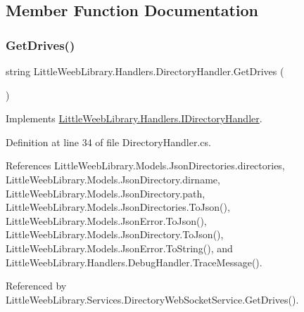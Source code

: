 \subsection{Member Function Documentation}
\mbox{\label{class_little_weeb_library_1_1_handlers_1_1_directory_handler_a6ab9fa9b838eeca3f918429af0a3564d}} 
\subsubsection{\texorpdfstring{Get\+Drives()}{GetDrives()}}
{\footnotesize\ttfamily string Little\+Weeb\+Library.\+Handlers.\+Directory\+Handler.\+Get\+Drives (\begin{DoxyParamCaption}{ }\end{DoxyParamCaption})}



Implements \mbox{\hyperlink{interface_little_weeb_library_1_1_handlers_1_1_i_directory_handler_ac0cc258a8bef2c9956638e14ad7d1e63}{Little\+Weeb\+Library.\+Handlers.\+I\+Directory\+Handler}}.



Definition at line 34 of file Directory\+Handler.\+cs.



References Little\+Weeb\+Library.\+Models.\+Json\+Directories.\+directories, Little\+Weeb\+Library.\+Models.\+Json\+Directory.\+dirname, Little\+Weeb\+Library.\+Models.\+Json\+Directory.\+path, Little\+Weeb\+Library.\+Models.\+Json\+Directories.\+To\+Json(), Little\+Weeb\+Library.\+Models.\+Json\+Error.\+To\+Json(), Little\+Weeb\+Library.\+Models.\+Json\+Directory.\+To\+Json(), Little\+Weeb\+Library.\+Models.\+Json\+Error.\+To\+String(), and Little\+Weeb\+Library.\+Handlers.\+Debug\+Handler.\+Trace\+Message().



Referenced by Little\+Weeb\+Library.\+Services.\+Directory\+Web\+Socket\+Service.\+Get\+Drives().


